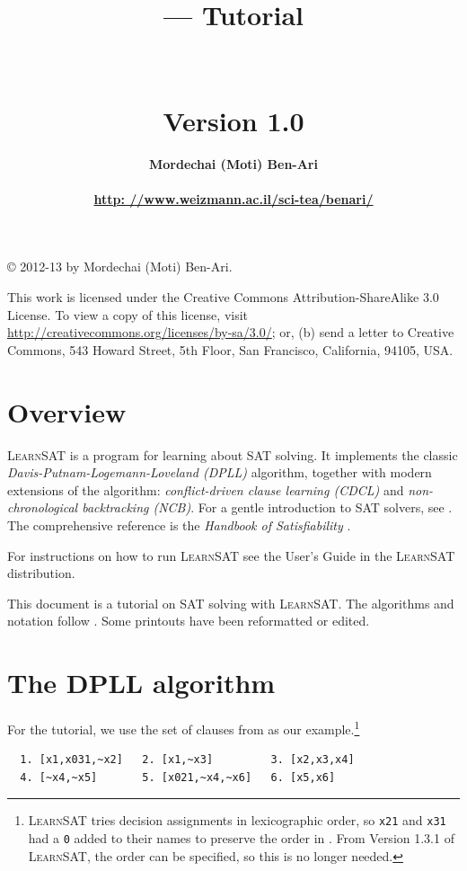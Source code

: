 \documentclass[11pt]{article}
\title{\bfseries \ls --- Tutorial\\\mbox{}\\\mbox{}\\
\bfseries\normalsize Version 1.0}
\author{\bfseries Mordechai (Moti) Ben-Ari\\\mbox{}\\
\url{http: //www.weizmann.ac.il/sci-tea/benari/}}
\newcommand*{\p}[1]{\textup{\texttt{#1}}}
\newcommand*{\ls}{\textsc{LearnSAT}}
\begin{document}
\maketitle

\thispagestyle{empty}

\vspace*{\fill}

\begin{center}
\copyright{} 2012-13 by Mordechai (Moti) Ben-Ari.
\end{center}
This work is licensed under the Creative Commons Attribution-ShareAlike 3.0
License. To view a copy of this license, visit
\url{http://creativecommons.org/licenses/by-sa/3.0/}; or, (b) send a letter
to Creative Commons, 543 Howard Street, 5th Floor, San Francisco,
California, 94105, USA.

\newpage

\section{Overview}

\ls{} is a program for learning about SAT solving. It implements the
classic \emph{Davis-Putnam-Logemann-Loveland (DPLL)} algorithm, together
with modern extensions of the algorithm: \emph{conflict-driven clause
learning (CDCL)} and \emph{non-chronological backtracking (NCB)}. For a
gentle introduction to SAT solvers, see \cite[Chapter~6]{mlcs}. The
comprehensive reference is the \emph{Handbook of Satisfiability}
\cite{SAT}.

For instructions on how to run \ls{} see the User's Guide in the \ls{}
distribution.

This document is a tutorial on SAT solving with \ls{}. The algorithms
and notation follow \cite{mlm}. Some printouts have been reformatted or
edited.

\section{The DPLL algorithm}

For the tutorial, we use the set of clauses from \cite{mlm} as our
example.\footnote{\ls{} tries decision assignments in lexicographic
order, so \p{x21} and \p{x31} had a \p{0} added to their names to
preserve the order in \cite{mlm}. From Version 1.3.1 of \ls{}, the order
can be specified, so this is no longer needed.}

\begin{verbatim}
  1. [x1,x031,~x2]   2. [x1,~x3]         3. [x2,x3,x4]
  4. [~x4,~x5]       5. [x021,~x4,~x6]   6. [x5,x6]
\end{verbatim}
\end{document}

